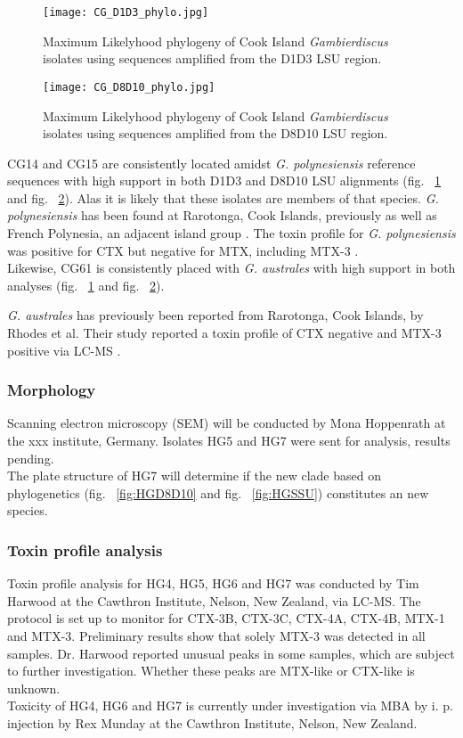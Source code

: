 \documentclass[12pt]{article}
\begin{document}
\begin{figure} 
\texttt{[image: CG\_D1D3\_phylo.jpg]} 
\caption{Maximum Likelyhood phylogeny of Cook Island \textit{Gambierdiscus} isolates using sequences amplified from the D1D3 LSU region.} 
\label{fig:CGD1D3}
\end{figure} 
\FloatBarrier 
\newpage

\begin{figure} 
\texttt{[image: CG\_D8D10\_phylo.jpg]} 
\caption{Maximum Likelyhood phylogeny of Cook Island \textit{Gambierdiscus} isolates using sequences amplified from the D8D10 LSU region.} 
\label{fig:CGD8D0}
\end{figure} 
\FloatBarrier 

CG14 and CG15 are consistently located amidst \emph{G. polynesiensis} reference sequences with high support in both D1D3 and D8D10 LSU alignments (fig. ~\ref{fig:CGD1D3} and fig. ~\ref{fig:CGD8D0}). Alas it is likely that these isolates are members of that species.
\emph{G. polynesiensis} has been found at Rarotonga, Cook Islands, previously \cite{rhodes2014production} as well as French Polynesia, an adjacent island group \cite{chinain1999morphology}. The toxin profile for \emph{G. polynesiensis} was positive for CTX \cite{chinain2010growth,rhodes2014production} but negative for MTX, including MTX-3 \cite{rhodes2014production}.
\\
Likewise, CG61 is consistently placed with \emph{G. australes} with high support in both analyses (fig. ~\ref{fig:CGD1D3} and fig. ~\ref{fig:CGD8D0}).

\emph{G. australes} has previously been reported from Rarotonga, Cook Islands, by Rhodes et al. Their study reported a toxin profile of CTX negative and MTX-3 positive via LC-MS \cite{rhodes2014production}.

\subsubsection{Morphology}
Scanning electron microscopy (SEM) will be conducted by Mona Hoppenrath at the xxx institute, Germany. Isolates HG5 and HG7 were sent for analysis, results pending.\\
The plate structure of HG7 will determine if the new clade based on phylogenetics (fig. ~\ref{fig:HGD8D10} and fig. ~\ref{fig:HGSSU}) constitutes an new species.


\subsubsection{Toxin profile analysis}
Toxin profile analysis for HG4, HG5, HG6 and HG7 was conducted by Tim Harwood at the Cawthron Institute, Nelson, New Zealand, via LC-MS. The protocol is set up to monitor for CTX-3B, CTX-3C, CTX-4A, CTX-4B, MTX-1 and MTX-3. Preliminary results show that solely MTX-3 was detected in all samples. Dr. Harwood reported unusual peaks in some samples, which are subject to further investigation. Whether these peaks are MTX-like or CTX-like is unknown.\\
Toxicity of HG4, HG6 and HG7 is currently under investigation via MBA by i. p. injection by Rex Munday at the Cawthron Institute, Nelson, New Zealand.\\
\end{document}
